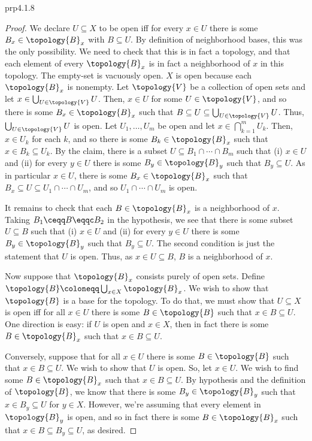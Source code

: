 \begin{prp}{}{prp4.1.8}
\begin{proof}
We declare $U\subseteq X$ to be open iff for every $x\in U$ there is some $B_x\in \topology{B}_x$ with $B\subseteq U$.  By definition of neighborhood bases, this was the only possibility.  We need to check that this is in fact a topology, and that each element of every $\topology{B}_x$ is in fact a neighborhood of $x$ in this topology.  The empty-set is vacuously open.  $X$ is open because each $\topology{B}_x$ is nonempty.  Let $\topology{V}$ be a collection of open sets and let $x\in \bigcup _{U\in \topology{V}}U$.  Then, $x\in U$ for some $U\in \topology{V}$, and so there is some $B_x\in \topology{B}_x$ such that $B\subseteq U\subseteq \bigcup _{U\in \topology{V}}U$.  Thus, $\bigcup _{U\in \topology{V}}U$ is open.  Let $U_1,\ldots ,U_m$ be open and let $x\in \bigcap _{k=1}^mU_k$.  Then, $x\in U_k$ for each $k$, and so there is some $B_k\in \topology{B}_x$ such that $x\in B_k\subseteq U_k$.  By the claim, there is a subset $U\subseteq B_1\cap \cdots \cap B_m$ such that (i) $x\in U$ and (ii) for every $y\in U$ there is some $B_y\in \topology{B}_y$ such that $B_y\subseteq U$.  As in particular $x\in U$, there is some $B_x\in \topology{B}_x$ such that $B_x\subseteq U\subseteq U_1\cap \cdots \cap U_m$, and so $U_1\cap \cdots \cap U_m$ is open.

It remains to check that each $B\in \topology{B}_x$ is a neighborhood of $x$.  Taking $B_1\ceqq B\eqqc B_2$ in the hypothesis, we see that there is some subset $U\subseteq B$ such that (i) $x\in U$ and (ii) for every $y\in U$ there is some $B_y\in \topology{B}_y$ such that $B_y\subseteq U$.  The second condition is just the statement that $U$ is open.  Thus, as $x\in U\subseteq B$, $B$ is a neighborhood of $x$.
		
\blankline
\noindent
Now suppose that $\topology{B}_x$ consists purely of open sets.  Define $\topology{B}\coloneqq \bigcup _{x\in X}\topology{B}_x$.  We wish to show that $\topology{B}$ is a base for the topology.  To do that, we must show that $U\subseteq X$ is open iff for all $x\in U$ there is some $B\in \topology{B}$ such that $x\in B\subseteq U$.  One direction is easy:  if $U$ is open and $x\in X$, then in fact there is some $B\in \topology{B}_x$ such that $x\in B\subseteq U$.
		
Conversely, suppose that for all $x\in U$ there is some $B\in \topology{B}$ such that $x\in B\subseteq U$.  We wish to show that $U$ is open.  So, let $x\in U$.  We wish to find some $B\in \topology{B}_x$ such that $x\in B\subseteq U$.  By hypothesis and the definition of $\topology{B}$, we know that there is some $B_y\in \topology{B}_y$ such that $x\in B_y\subseteq U$ for $y\in X$.  However, we're assuming that every element in $\topology{B}_y$ is open, and so in fact there is some $B\in \topology{B}_x$ such that $x\in B\subseteq B_y\subseteq U$, as desired.
\end{proof}
\end{prp}
